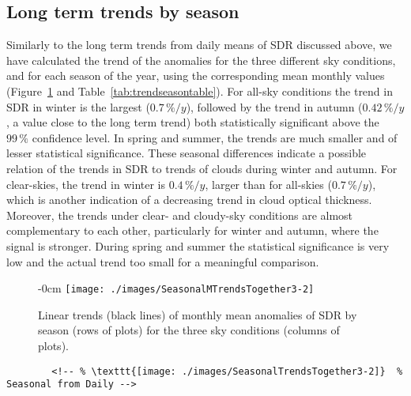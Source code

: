 \documentclass[applsci,article,submit,moreauthors,pdftex]{Definitions/mdpi}
\begin{document}
\hypertarget{long-term-trends-by-season}{%
\subsection{Long term trends by
season}\label{long-term-trends-by-season}}

Similarly to the long term trends from daily means of SDR discussed
above, we have calculated the trend of the anomalies for the three
different sky conditions, and for each season of the year, using the
corresponding mean monthly values (Figure~\ref{fig:seasonalALL} and
Table~\ref{tab:trendseasontable}). For all-sky conditions the trend in
SDR in winter is the largest (\(0.7\,\%/y\)), followed by the trend in
autumn (\(0.42\,\%/y\), a value close to the long term trend) both
statistically significant above the \(99\,\%\) confidence level. In
spring and summer, the trends are much smaller and of lesser statistical
significance. These seasonal differences indicate a possible relation of
the trends in SDR to trends of clouds during winter and autumn. For
clear-skies, the trend in winter is \(0.4\,\%/y\), larger than for
all-skies (\(0.7\,\%/y\)), which is another indication of a decreasing
trend in cloud optical thickness. Moreover, the trends under clear- and
cloudy-sky conditions are almost complementary to each other,
particularly for winter and autumn, where the signal is stronger. During
spring and summer the statistical significance is very low and the
actual trend too small for a meaningful comparison.

\begin{figure}[h!]
    \begin{adjustwidth}{-\extralength}{0cm}
        {\centering 
            \texttt{[image: ./images/SeasonalMTrendsTogether3-2]}   %
        }
        \caption{Linear trends (black lines) of monthly mean anomalies of SDR by season (rows of plots) for the three sky conditions (columns of plots).}\label{fig:seasonalALL}
    \end{adjustwidth}
\end{figure}

\begin{verbatim}
        <!-- % \texttt{[image: ./images/SeasonalTrendsTogether3-2]}  % Seasonal from Daily -->
\end{verbatim}
\end{document}
